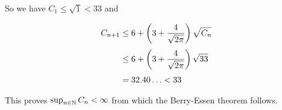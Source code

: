 So we have $C_1 \le \sqrt{1} < 33$ and

\begin{align}
  C_{n+1} & \le 6+\left(3 + \frac{4}{\sqrt{2\pi}}\right) \sqrt{C_n} \nl
  & \le 6+\left(3 + \frac{4}{\sqrt{2\pi}}\right) \sqrt{33} \nl
  & = 32.40\ldots < 33
\end{align}

This proves $\sup_{n\in\mathbb N} C_n < \infty$ from which the Berry-Essen theorem follows.
